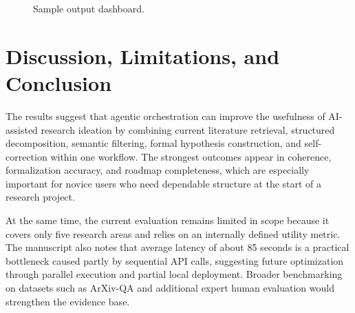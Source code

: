 \documentclass[conference]{IEEEtran}
\begin{document}
\begin{figure}[htbp]
{%
}
\caption{Sample output dashboard.}
\label{fig:dashboard}
\end{figure}

\section{Discussion, Limitations, and Conclusion}
The results suggest that agentic orchestration can improve the usefulness of AI-assisted research ideation by combining current literature retrieval, structured decomposition, semantic filtering, formal hypothesis construction, and self-correction within one workflow. The strongest outcomes appear in coherence, formalization accuracy, and roadmap completeness, which are especially important for novice users who need dependable structure at the start of a research project.

At the same time, the current evaluation remains limited in scope because it covers only five research areas and relies on an internally defined utility metric. The manuscript also notes that average latency of about 85 seconds is a practical bottleneck caused partly by sequential API calls, suggesting future optimization through parallel execution and partial local deployment. Broader benchmarking on datasets such as ArXiv-QA \cite{es2023ragas} and additional expert human evaluation would strengthen the evidence base.
\end{document}
